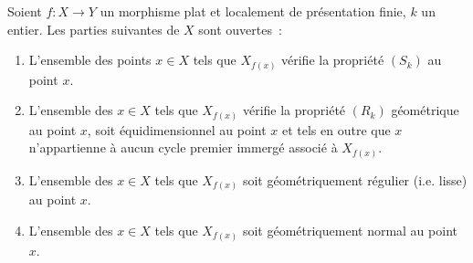 \begin{theorem}[12.1.6]
\label{IV.12.1.6-fr}
Soient $f:X\to Y$ un morphisme \textup{plat} et localement de présentation finie, $k$
un entier. Les parties suivantes de $X$ sont ouvertes~:
\begin{enumerate}[label=\textup{(\roman*)}]
  \item L'ensemble des points $x\in X$ tels que $X_{f(x)}$ vérifie la propriété
  $(S_k)$ au point $x$.
  \item L'ensemble des $x\in X$ tels que $X_{f(x)}$ vérifie la propriété
  $(R_k)$ géométrique au point $x$, soit équidimensionnel au point $x$ et tels
  en outre que $x$ n'appartienne à aucun cycle premier immergé associé à
  $X_{f(x)}$.
  \item L'ensemble des $x\in X$ tels que $X_{f(x)}$ soit géométriquement
  régulier \textup{(i.e.} lisse\textup{)} au point $x$.
  \item L'ensemble des $x\in X$ tels que $X_{f(x)}$ soit géométriquement
  normal au point $x$.
\end{enumerate}
\end{theorem}


